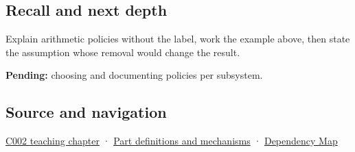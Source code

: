 \subsection{Recall and next depth}\label{appendix-2ed044358b82-recall-and-next-depth}

Explain arithmetic policies without the label, work the example above, then state the assumption whose removal would change the result.

\textbf{Pending:} choosing and documenting policies per subsystem.

\subsection{Source and navigation}\label{appendix-2ed044358b82-source-and-navigation}

\hyperref[01-foundations-i-ch001-arithmetic-becomes-a-policy]{C002 teaching chapter} · \hyperref[appendix-fd090d982a15]{Part definitions and mechanisms} · \hyperref[appendix-4ad47bdd269a]{Dependency Map}
